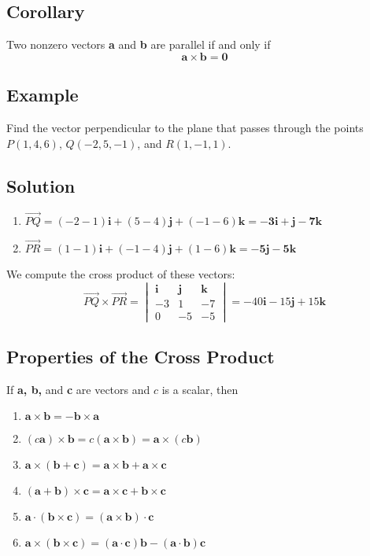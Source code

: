 \subsection*{Corollary}
Two nonzero vectors \textbf{a} and \textbf{b} are parallel if and only if
$$\mathbf{a\times b=0}$$

\subsection*{Example}
Find the vector perpendicular to the plane that passes through the points $P(1,4,6)$,
$Q(-2,5,-1)$, and $R(1,-1,1)$.

\subsection*{Solution}
\begin{enumerate}
    \item[] $\overrightarrow{PQ}=(-2-1)\textbf{i}+(5-4)\textbf{j}+(-1-6)\textbf{k}=\mathbf{-3i+j-7k}$
    \item[] $\overrightarrow{PR}=(1-1)\textbf{i}+(-1-4)\textbf{j}+(1-6)\textbf{k}=\mathbf{-5j-5k}$
\end{enumerate}
We compute the cross product of these vectors:
$$\overrightarrow{PQ}\times \overrightarrow{PR}=\begin{vmatrix}
        \textbf{i} & \textbf{j} & \textbf{k} \\
        -3         & 1          & -7         \\
        0          & -5         & -5
    \end{vmatrix}=-40\textbf{i}-15\textbf{j}+15\textbf{k}$$

\subsection*{Properties of the Cross Product}
If \textbf{a, b,} and \textbf{c} are vectors and $c$ is a scalar, then
\begin{enumerate}
    \item $\mathbf{a\times b=-b\times a}$
    \item $(c\textbf{a})\times \textbf{b}=c(\mathbf{a\times b})=\textbf{a}\times(c\textbf{b})$
    \item $\mathbf{a\times (b+c)=a\times b+a\times c}$
    \item $\mathbf{(a+b)\times c=a\times c+b\times c}$
    \item $\mathbf{a\cdot (b\times c)=(a\times b)\cdot c}$
    \item $\mathbf{a\times (b\times c)=(a\cdot c)b-(a\cdot b)c}$
\end{enumerate}

